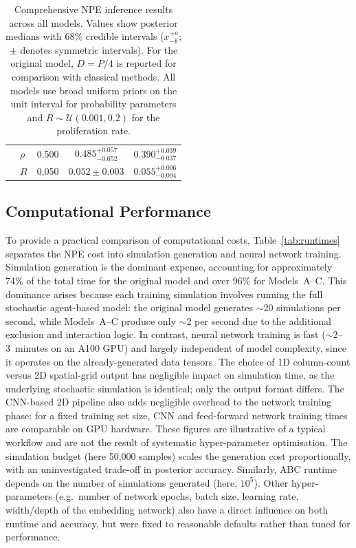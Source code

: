 \documentclass{article}
\begin{document}
\begin{table}[htbp]
\begin{tabular}{@{}llccc@{}}
		                                    & $\rho$ & 0.500 & $0.485^{+0.057}_{-0.052}$ & $0.390^{+0.039}_{-0.037}$ \\
		                                    & $R$    & 0.050 & $0.052 \pm 0.003$ & $0.055^{+0.006}_{-0.004}$ \\
		\bottomrule
	\end{tabular}
	\caption{Comprehensive NPE inference results across all models. Values show posterior medians with 68\% credible intervals ($x^{+a}_{-b}$; $\pm$ denotes symmetric intervals). For the original model, $D = P/4$ is reported for comparison with classical methods. All models use broad uniform priors on the unit interval for probability parameters and $R \sim \mathcal{U}(0.001, 0.2)$ for the proliferation rate.}
	\label{tab:all_results}
\end{table}


\subsection{Computational Performance}\label{sec:runtime}

To provide a practical comparison of computational costs, Table~\ref{tab:runtimes} separates the NPE cost into simulation generation and neural network training. Simulation generation is the dominant expense, accounting for approximately 74\% of the total time for the original model and over 96\% for Models~A--C. This dominance arises because each training simulation involves running the full stochastic agent-based model: the original model generates $\sim$20 simulations per second, while Models~A--C produce only $\sim$2 per second due to the additional exclusion and interaction logic. In contrast, neural network training is fast ($\sim$2--3~minutes on an A100 GPU) and largely independent of model complexity, since it operates on the already-generated data tensors. The choice of 1D column-count versus 2D spatial-grid output has negligible impact on simulation time, as the underlying stochastic simulation is identical; only the output format differs. The CNN-based 2D pipeline also adds negligible overhead to the network training phase: for a fixed training set size, CNN and feed-forward network training times are comparable on GPU hardware. These figures are illustrative of a typical workflow and are not the result of systematic hyper-parameter optimisation. The simulation budget (here 50{,}000 samples) scales the generation cost proportionally, with an uninvestigated trade-off in posterior accuracy. Similarly, ABC runtime depends on the number of simulations generated (here, $10^5$). Other hyper-parameters (e.g.\ number of network epochs, batch size, learning rate, width/depth of the embedding network) also have a direct influence on both runtime and accuracy, but were fixed to reasonable defaults rather than tuned for performance.
\end{document}
